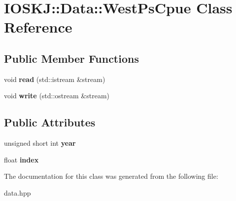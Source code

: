 \hypertarget{classIOSKJ_1_1Data_1_1WestPsCpue}{\section{I\-O\-S\-K\-J\-:\-:Data\-:\-:West\-Ps\-Cpue Class Reference}
\label{classIOSKJ_1_1Data_1_1WestPsCpue}
}
\subsection*{Public Member Functions}
\begin{DoxyCompactItemize}
\item 
\hypertarget{classIOSKJ_1_1Data_1_1WestPsCpue_a4a66b4d327983bbcc8262cae217c7ede}{void {\bfseries read} (std\-::istream \&stream)}\label{classIOSKJ_1_1Data_1_1WestPsCpue_a4a66b4d327983bbcc8262cae217c7ede}

\item 
\hypertarget{classIOSKJ_1_1Data_1_1WestPsCpue_a21ae334f9ae536b2624e403c3b77216f}{void {\bfseries write} (std\-::ostream \&stream)}\label{classIOSKJ_1_1Data_1_1WestPsCpue_a21ae334f9ae536b2624e403c3b77216f}

\end{DoxyCompactItemize}
\subsection*{Public Attributes}
\begin{DoxyCompactItemize}
\item 
\hypertarget{classIOSKJ_1_1Data_1_1WestPsCpue_a76ed2a7cfc9dc71cd96e979a9310a4c7}{unsigned short int {\bfseries year}}\label{classIOSKJ_1_1Data_1_1WestPsCpue_a76ed2a7cfc9dc71cd96e979a9310a4c7}

\item 
\hypertarget{classIOSKJ_1_1Data_1_1WestPsCpue_a93d81fdc1e2168e56d3c7fc1173c493a}{float {\bfseries index}}\label{classIOSKJ_1_1Data_1_1WestPsCpue_a93d81fdc1e2168e56d3c7fc1173c493a}

\end{DoxyCompactItemize}


The documentation for this class was generated from the following file\-:\begin{DoxyCompactItemize}
\item 
data.\-hpp\end{DoxyCompactItemize}
